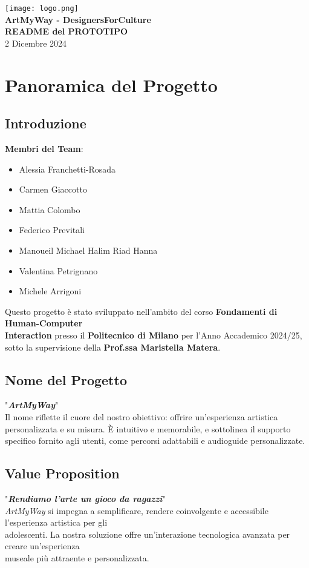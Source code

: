\documentclass{article}
\begin{document}
\begin{center}
    \texttt{[image: logo.png]} \\[1em]
    {\LARGE \textbf{ArtMyWay - DesignersForCulture}} \\[0.5em]
    {\Large \textbf{README del PROTOTIPO}} \\[1.5em]
    {\large 2 Dicembre 2024}
\end{center}

\section{Panoramica del Progetto}
\subsection{Introduzione}
\textbf{Membri del Team}:
\begin{itemize}
\item Alessia Franchetti-Rosada
\item Carmen Giaccotto
\item Mattia Colombo
\item Federico Previtali
\item Manoueil Michael Halim Riad Hanna
\item Valentina Petrignano
\item Michele Arrigoni
\end{itemize}
Questo progetto è stato sviluppato nell'ambito del corso \textbf{Fondamenti di Human-Computer \\ Interaction} presso il \textbf{Politecnico di Milano} per l'Anno Accademico 2024/25, sotto la supervisione della \textbf{Prof.ssa Maristella Matera}.

\subsection{Nome del Progetto}
"\textbf{\textit{ArtMyWay}}" \\
Il nome riflette il cuore del nostro obiettivo: offrire un'esperienza artistica personalizzata e su misura. È intuitivo e memorabile, e sottolinea il supporto specifico fornito agli utenti, come percorsi adattabili e audioguide personalizzate.

\subsection{Value Proposition}
"\textbf{\textit{Rendiamo l'arte un gioco da ragazzi}}"\\
\textit{ArtMyWay} si impegna a semplificare, rendere coinvolgente e accessibile l'esperienza artistica per gli \\ adolescenti. La nostra soluzione offre un'interazione tecnologica avanzata per creare un'esperienza \\ museale più attraente e personalizzata.
\end{document}
